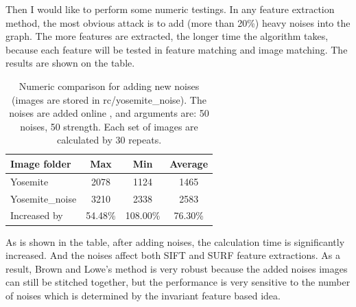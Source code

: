 \documentclass[10pt,twocolumn,letterpaper]{article}
\begin{document}
Then I would like to perform some numeric testings.
In any feature extraction method, the most obvious attack is to add (more than 20\%) heavy noises into the graph.
The more features are extracted, the longer time the algorithm takes, because each feature will be tested in feature matching and image matching.
The results are shown on the table.

\begin{table}
\begin{center}
\begin{tabular}{|l|c|c|c|}
\hline
Image folder & Max & Min & Average \\
\hline\hline
Yosemite & 2078 & 1124 & 1465 \\
Yosemite\_noise & 3210 & 2338 & 2583 \\
Increased by & 54.48\% & 108.00\% & 76.30\% \\
\hline
\end{tabular}
\end{center}
\caption{Numeric comparison for adding new noises (images are stored in rc/yosemite\_noise). The noises are added online \cite{noise}, and arguments are: 50 noises, 50 strength. Each set of images are calculated by 30 repeats.}
\end{table}

As is shown in the table, after adding noises, the calculation time is significantly increased.
And the noises affect both SIFT and SURF feature extractions.
As a result, Brown and Lowe's method is very robust because the added noises images can still be stitched together,
but the performance is very sensitive to the number of noises which is determined by the invariant feature based idea.
\end{document}
